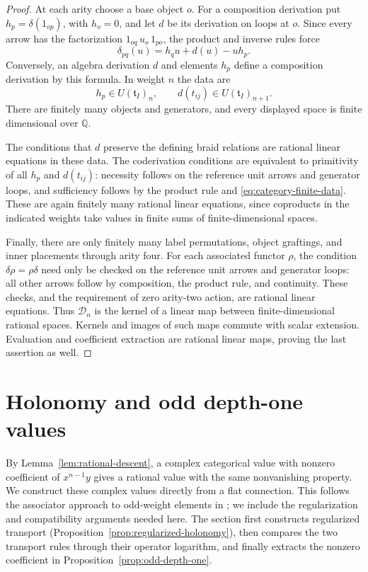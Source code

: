 \documentclass[11pt]{article}
\newcommand{\Q}{\mathbb Q}
\theoremstyle{definition}
\theoremstyle{remark}
\numberwithin{equation}{section}
\begin{document}
\begin{proof}
At each arity choose a base object $o$.  For a composition derivation
put $h_p=\delta(1_{op})$, with $h_o=0$, and let $d$ be its derivation on
loops at $o$.  Since every arrow has the factorization
$1_{oq}\,u_o\,1_{po}$, the product and inverse rules force
\begin{equation}\label{eq:category-finite-data}
 \delta_{pq}(u)=h_qu+d(u)-uh_p.
\end{equation}
Conversely, an algebra derivation $d$ and elements $h_p$ define a
composition derivation by this formula.  In weight $n$ the data are
\[
 h_p\in U(\mathfrak t_I)_n,
 \qquad d(t_{ij})\in U(\mathfrak t_I)_{n+1}.
\]
There are finitely many objects and generators, and every displayed
space is finite dimensional over $\Q$.

The conditions that $d$ preserve the defining braid relations are
rational linear equations in these data.  The coderivation conditions
are equivalent to primitivity of all $h_p$ and $d(t_{ij})$: necessity
follows on the reference unit arrows and generator loops, and
sufficiency follows by the product rule and
\eqref{eq:category-finite-data}.  These are again finitely many rational
linear equations, since coproducts in the indicated weights take
values in finite sums of finite-dimensional spaces.

Finally, there are only finitely many label permutations, object
graftings, and inner placements through arity four.  For each associated
functor $\rho$, the condition $\delta\rho=\rho\delta$ need only be
checked on the reference unit arrows and generator loops: all other
arrows follow by composition, the product rule, and continuity.
These checks, and the requirement of zero arity-two action, are
rational linear equations.  Thus $\mathcal D_n$ is the kernel of a
linear map between finite-dimensional rational spaces.  Kernels and
images of such maps commute with scalar extension.  Evaluation and
coefficient extraction are rational linear maps, proving the last
assertion as well.
\end{proof}

\section{Holonomy and odd depth-one values}\label{sec:holonomy}

By Lemma~\ref{lem:rational-descent}, a complex categorical value with
nonzero coefficient of $x^{n-1}y$ gives a rational value with the same
nonvanishing property.  We construct these complex values directly
from a flat connection.
This follows the associator approach to odd-weight elements in
\cite[Proposition~6.3]{Drinfeld}; we include the regularization and
compatibility arguments needed here.  The section first constructs
regularized transport (Proposition~\ref{prop:regularized-holonomy}),
then compares the two transport rules through their operator logarithm,
and finally extracts the nonzero coefficient in
Proposition~\ref{prop:odd-depth-one}.
\end{document}
